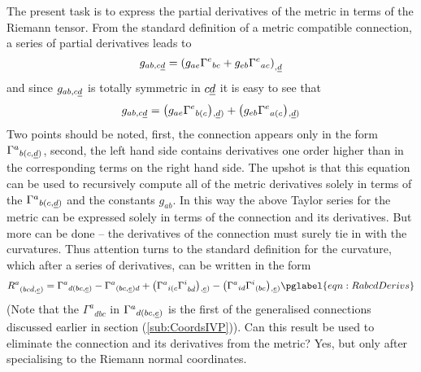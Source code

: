 \documentclass[a4paper,12pt]{article}
\numberwithin{equation}{section}
\begin{document}
The present task is to express the partial derivatives of the metric in terms of the Riemann
tensor. From the standard definition of a metric compatible connection, a series of partial
derivatives leads to
\[
g_{ab,c\ud} = \left(g_{ae}\Gamma^{e}{}_{bc}+g_{eb}\Gamma^{e}{}_{ac}\right)_{,\ud}
\]
and since $g_{ab,c\ud}$ is totally symmetric in $c\ud$ it is easy to see that
\[
g_{ab,c\ud} = \left(g_{ae}\Gamma^{e}{}_{b(c}\right){}_{\!,\ud)}
            + \left(g_{eb}\Gamma^{e}{}_{a(c}\right){}_{\!,\ud)}
\]
Two points should be noted, first, the connection appears only in the form
$\Gamma^{a}{}_{b(c,\ud)}$, second, the left hand side contains derivatives one order higher
than in the corresponding terms on the right hand side. The upshot is that this equation can
be used to recursively compute all of the metric derivatives solely in terms of the
$\Gamma^{a}{}_{b(c,\ud)}$ and the constants $g_{ab}$. In this way the above Taylor series
for the metric can be expressed solely in terms of the connection and its derivatives. But
more can be done -- the derivatives of the connection must surely tie in with the
curvatures. Thus attention turns to the standard definition for the curvature, which after a
series of derivatives, can be written in the form
\begin{equation}
R^a{}_{(bc{\Dot d},\ue)} = \Gamma^a{}_{d(bc,\ue)} - \Gamma^a{}_{(bc,\ue)d}
                         + \left(\Gamma^a{}_{i(c}\Gamma^i{}_{b{\Dot d}}\right){}_{\!,\ue)}
                         - \left(\Gamma^a{}_{id}\Gamma^i{}_{(bc}\right){}_{\!,\ue)}
\pglabel{eqn:RabcdDerivs}
\end{equation}
(Note that the $\Gamma^a{}_{dbc}$ in $\Gamma^a{}_{d(bc,\ue)}$ is the first of the
generalised connections discussed earlier in section (\ref{sub:CoordsIVP})). Can this result
be used to eliminate the connection and its derivatives from the metric? Yes, but only after
specialising to the Riemann normal coordinates.
\end{document}
